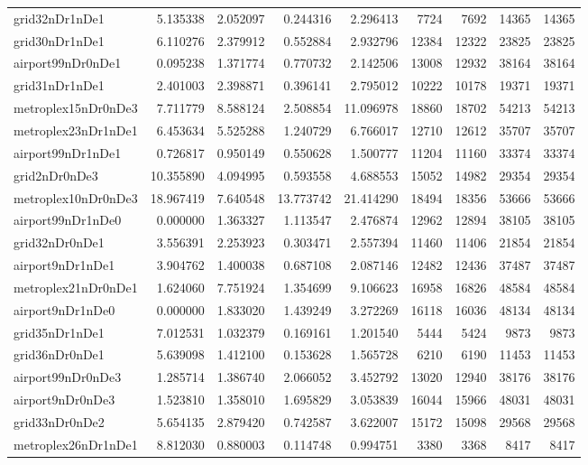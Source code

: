 \begin{longtable}{|l|r|r|r|r|r|r|r|r|}
grid32nDr1nDe1 & 5.135338 & 2.052097 & 0.244316 & 2.296413 & 7724 & 7692 & 14365 & 14365 \\
grid30nDr1nDe1 & 6.110276 & 2.379912 & 0.552884 & 2.932796 & 12384 & 12322 & 23825 & 23825 \\
airport99nDr0nDe1 & 0.095238 & 1.371774 & 0.770732 & 2.142506 & 13008 & 12932 & 38164 & 38164 \\
grid31nDr1nDe1 & 2.401003 & 2.398871 & 0.396141 & 2.795012 & 10222 & 10178 & 19371 & 19371 \\
metroplex15nDr0nDe3 & 7.711779 & 8.588124 & 2.508854 & 11.096978 & 18860 & 18702 & 54213 & 54213 \\
metroplex23nDr1nDe1 & 6.453634 & 5.525288 & 1.240729 & 6.766017 & 12710 & 12612 & 35707 & 35707 \\
airport99nDr1nDe1 & 0.726817 & 0.950149 & 0.550628 & 1.500777 & 11204 & 11160 & 33374 & 33374 \\
grid2nDr0nDe3 & 10.355890 & 4.094995 & 0.593558 & 4.688553 & 15052 & 14982 & 29354 & 29354 \\
metroplex10nDr0nDe3 & 18.967419 & 7.640548 & 13.773742 & 21.414290 & 18494 & 18356 & 53666 & 53666 \\
airport99nDr1nDe0 & 0.000000 & 1.363327 & 1.113547 & 2.476874 & 12962 & 12894 & 38105 & 38105 \\
grid32nDr0nDe1 & 3.556391 & 2.253923 & 0.303471 & 2.557394 & 11460 & 11406 & 21854 & 21854 \\
airport9nDr1nDe1 & 3.904762 & 1.400038 & 0.687108 & 2.087146 & 12482 & 12436 & 37487 & 37487 \\
metroplex21nDr0nDe1 & 1.624060 & 7.751924 & 1.354699 & 9.106623 & 16958 & 16826 & 48584 & 48584 \\
airport9nDr1nDe0 & 0.000000 & 1.833020 & 1.439249 & 3.272269 & 16118 & 16036 & 48134 & 48134 \\
grid35nDr1nDe1 & 7.012531 & 1.032379 & 0.169161 & 1.201540 & 5444 & 5424 & 9873 & 9873 \\
grid36nDr0nDe1 & 5.639098 & 1.412100 & 0.153628 & 1.565728 & 6210 & 6190 & 11453 & 11453 \\
airport99nDr0nDe3 & 1.285714 & 1.386740 & 2.066052 & 3.452792 & 13020 & 12940 & 38176 & 38176 \\
airport9nDr0nDe3 & 1.523810 & 1.358010 & 1.695829 & 3.053839 & 16044 & 15966 & 48031 & 48031 \\
grid33nDr0nDe2 & 5.654135 & 2.879420 & 0.742587 & 3.622007 & 15172 & 15098 & 29568 & 29568 \\
metroplex26nDr1nDe1 & 8.812030 & 0.880003 & 0.114748 & 0.994751 & 3380 & 3368 & 8417 & 8417 \\

\end{longtable}
